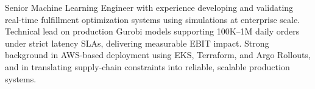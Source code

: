 


\begin{cvparagraph}
Senior Machine Learning Engineer with experience developing and validating real-time fulfillment optimization systems using simulations at enterprise scale. Technical lead on production Gurobi models supporting 100K–1M daily orders under strict latency SLAs, delivering measurable EBIT impact. Strong background in AWS-based deployment using EKS, Terraform, and Argo Rollouts, and in translating supply-chain constraints into reliable, scalable production systems.
\end{cvparagraph}
